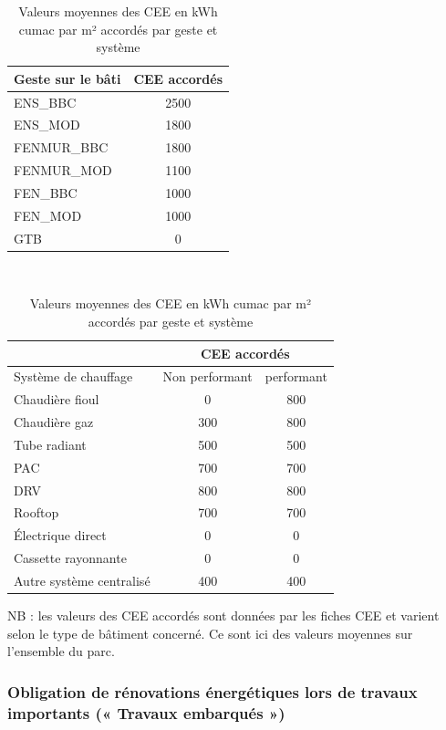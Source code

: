 \documentclass[10.5pt,a4paper]{article}
\begin{document}
{\begin{table}[h!] \caption{Valeurs moyennes des CEE en  kWh cumac par m² accordés par geste et système}
\begin{center}
\begin{tabular}[c]{|l|c|}
\hline
Geste sur le bâti 	& CEE accordés	 \\
\hline
ENS\_BBC						& 2500 \\
ENS\_MOD						& 1800 \\
FENMUR\_BBC					& 1800 \\
FENMUR\_MOD					& 1100 \\
FEN\_BBC						& 1000 \\
FEN\_MOD						& 1000 \\
GTB									& 0 \\
\hline
\end{tabular}
\\
\begin{tabular}[c]{|l|c|c|}
\hline
													& \multicolumn{2}{c}{CEE accordés} 	\\
													\hline
Système de chauffage			& Non performant	& performant \\
\hline
Chaudière fioul						& 0	& 800 \\
Chaudière gaz							& 300	& 800 \\
Tube radiant							& 500	& 500 \\
PAC												& 700	& 700 \\
DRV												& 800	& 800 \\
Rooftop										& 700	& 700  \\
Électrique direct					& 0	& 0 \\
Cassette rayonnante				& 0	& 0 \\
Autre système centralisé	& 400	& 400  \\
\hline
\end{tabular}
\end{center}

\footnotesize{NB : les valeurs des CEE accordés sont données par les fiches CEE et varient selon le type de bâtiment concerné. Ce sont ici des valeurs moyennes sur l’ensemble du parc. }
\end{table}

\subsubsection{Obligation de rénovations énergétiques lors de travaux importants (« Travaux embarqués »)}

}
\end{document}
